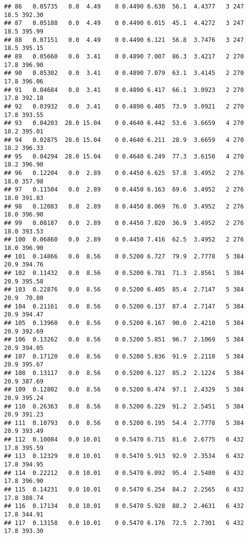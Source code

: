 \documentclass[
]{article}
\begin{document}
\begin{verbatim}
## 86   0.05735   0.0  4.49    0 0.4490 6.630  56.1  4.4377   3 247    18.5 392.30
## 87   0.05188   0.0  4.49    0 0.4490 6.015  45.1  4.4272   3 247    18.5 395.99
## 88   0.07151   0.0  4.49    0 0.4490 6.121  56.8  3.7476   3 247    18.5 395.15
## 89   0.05660   0.0  3.41    0 0.4890 7.007  86.3  3.4217   2 270    17.8 396.90
## 90   0.05302   0.0  3.41    0 0.4890 7.079  63.1  3.4145   2 270    17.8 396.06
## 91   0.04684   0.0  3.41    0 0.4890 6.417  66.1  3.0923   2 270    17.8 392.18
## 92   0.03932   0.0  3.41    0 0.4890 6.405  73.9  3.0921   2 270    17.8 393.55
## 93   0.04203  28.0 15.04    0 0.4640 6.442  53.6  3.6659   4 270    18.2 395.01
## 94   0.02875  28.0 15.04    0 0.4640 6.211  28.9  3.6659   4 270    18.2 396.33
## 95   0.04294  28.0 15.04    0 0.4640 6.249  77.3  3.6150   4 270    18.2 396.90
## 96   0.12204   0.0  2.89    0 0.4450 6.625  57.8  3.4952   2 276    18.0 357.98
## 97   0.11504   0.0  2.89    0 0.4450 6.163  69.6  3.4952   2 276    18.0 391.83
## 98   0.12083   0.0  2.89    0 0.4450 8.069  76.0  3.4952   2 276    18.0 396.90
## 99   0.08187   0.0  2.89    0 0.4450 7.820  36.9  3.4952   2 276    18.0 393.53
## 100  0.06860   0.0  2.89    0 0.4450 7.416  62.5  3.4952   2 276    18.0 396.90
## 101  0.14866   0.0  8.56    0 0.5200 6.727  79.9  2.7778   5 384    20.9 394.76
## 102  0.11432   0.0  8.56    0 0.5200 6.781  71.3  2.8561   5 384    20.9 395.58
## 103  0.22876   0.0  8.56    0 0.5200 6.405  85.4  2.7147   5 384    20.9  70.80
## 104  0.21161   0.0  8.56    0 0.5200 6.137  87.4  2.7147   5 384    20.9 394.47
## 105  0.13960   0.0  8.56    0 0.5200 6.167  90.0  2.4210   5 384    20.9 392.69
## 106  0.13262   0.0  8.56    0 0.5200 5.851  96.7  2.1069   5 384    20.9 394.05
## 107  0.17120   0.0  8.56    0 0.5200 5.836  91.9  2.2110   5 384    20.9 395.67
## 108  0.13117   0.0  8.56    0 0.5200 6.127  85.2  2.1224   5 384    20.9 387.69
## 109  0.12802   0.0  8.56    0 0.5200 6.474  97.1  2.4329   5 384    20.9 395.24
## 110  0.26363   0.0  8.56    0 0.5200 6.229  91.2  2.5451   5 384    20.9 391.23
## 111  0.10793   0.0  8.56    0 0.5200 6.195  54.4  2.7778   5 384    20.9 393.49
## 112  0.10084   0.0 10.01    0 0.5470 6.715  81.6  2.6775   6 432    17.8 395.59
## 113  0.12329   0.0 10.01    0 0.5470 5.913  92.9  2.3534   6 432    17.8 394.95
## 114  0.22212   0.0 10.01    0 0.5470 6.092  95.4  2.5480   6 432    17.8 396.90
## 115  0.14231   0.0 10.01    0 0.5470 6.254  84.2  2.2565   6 432    17.8 388.74
## 116  0.17134   0.0 10.01    0 0.5470 5.928  88.2  2.4631   6 432    17.8 344.91
## 117  0.13158   0.0 10.01    0 0.5470 6.176  72.5  2.7301   6 432    17.8 393.30

\end{verbatim}
\end{document}
